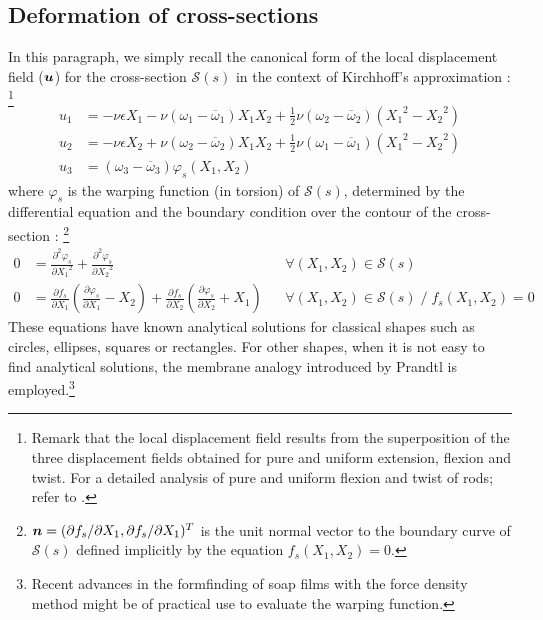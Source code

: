 \subsection{Deformation of cross-sections}
In this paragraph, we simply recall the canonical form of the local displacement field ($\boldsymbol{u}$) for the cross-section $\mathcal{S}(s)$ in the context of Kirchhoff's approximation : \footnote{Remark that the local displacement field results from the superposition of the three displacement fields obtained for pure and uniform extension, flexion and twist. For a detailed analysis of pure and uniform flexion and twist of rods; refer to \cite[ch.~3]{Audoly2010}.}
\begin{subequations}
	\begin{alignat}{1}
	u_1 &=
	-\nu \epsilon X_1 
	- \nu(\omega_1 - \overbar{\omega}_1) X_1 X_2
	+ \tfrac{1}{2}\nu(\omega_2 - \overbar{\omega}_2)({X_1}^2 - {X_2}^2)
	\\[0.5em]
	u_2 &= 
	-\nu \epsilon X_2 
	+ \nu(\omega_2 - \overbar{\omega}_2) X_1 X_2
	+ \tfrac{1}{2}\nu(\omega_1 - \overbar{\omega}_1)({X_1}^2 - {X_2}^2)
	\\[0.5em]
	u_3 &= (\omega_3 - \overbar{\omega}_3)\varphi_s(X_1,X_2)
	\end{alignat}
\end{subequations}
where $\varphi_s$ is the warping function (in torsion) of $\mathcal{S}(s)$, determined by the differential equation and the boundary condition over the contour of the cross-section : \footnote{$\boldsymbol{n} = ({\partial f_s}/{\partial {X_1}}, {\partial f_s}/{\partial {X_1}})^T$ is the unit normal vector to the boundary curve of $\mathcal{S}(s)$ defined implicitly by the equation $f_s(X_1,X_2)=0$.}
\begin{subequations}
	\begin{alignat}{2}
	0 &= \frac{\partial^2 \varphi_s}{\partial {X_1}^2} + \frac{\partial^2 \varphi_s}{\partial {X_2}^2}
	&& \forall (X_1,X_2)\in\mathcal{S}(s)
	\\[0.5em]
	0 &= \frac{\partial f_s}{\partial {X_1}}\left(\frac{\partial \varphi_s}{\partial {X_1}} - X_2 \right) 
	+ \frac{\partial f_s}{\partial {X_2}}\left(\frac{\partial \varphi_s}{\partial {X_2}} + X_1 \right)
	&& \forall (X_1,X_2)\in\mathcal{S}(s)\; / \; f_s(X_1,X_2) = 0
	\end{alignat}
\end{subequations}
These equations have known analytical solutions for classical shapes such as circles, ellipses, squares or rectangles. For other shapes, when it is not easy to find analytical solutions, the membrane analogy introduced by Prandtl \cite{Prandtl1903} is employed.\footnote{Recent advances \cite{Koohestani2014} in the formfinding of soap films with the force density method might be of practical use to evaluate the warping function.}

